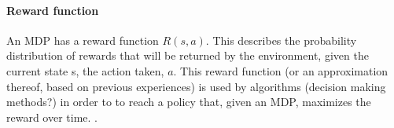 \paragraph{Reward function}

An MDP has a reward function $R(s, a)$. This describes the probability distribution of rewards that will be returned by the environment, given the current state s, the action taken, $a$. This reward function (or an approximation thereof, based on previous experiences) is used by algorithms (decision making methods?) in order to to reach a policy that, given an MDP, maximizes the reward over time. \parencite{altman2002applications}.


